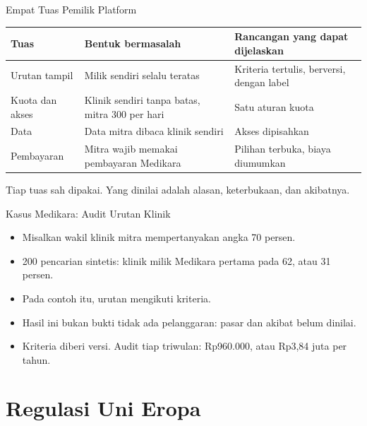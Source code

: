 \documentclass[aspectratio=169, table, 12pt]{beamer}
\begin{document}
\begin{frame}{{\Large Empat Tuas Pemilik Platform}}
  \footnotesize
  \begin{tabularx}{\textwidth}{>{\raggedright\arraybackslash}p{2.4cm} >{\raggedright\arraybackslash}X >{\raggedright\arraybackslash}X}
    \hline
    \textbf{Tuas} & \textbf{Bentuk bermasalah} & \textbf{Rancangan yang dapat dijelaskan} \\ \hline
    Urutan tampil & Milik sendiri selalu teratas & Kriteria tertulis, berversi, dengan label \\ \hline
    Kuota dan akses & Klinik sendiri tanpa batas, mitra 300 per hari & Satu aturan kuota \\ \hline
    Data & Data mitra dibaca klinik sendiri & Akses dipisahkan \\ \hline
    Pembayaran & Mitra wajib memakai pembayaran Medikara & Pilihan terbuka, biaya diumumkan \\ \hline
  \end{tabularx}

  \vspace{8pt}
  \small Tiap tuas sah dipakai. Yang dinilai adalah alasan, keterbukaan, dan akibatnya.
\end{frame}

\begin{frame}{{\Large Kasus Medikara: Audit Urutan Klinik}}
  \vspace{6pt}
  \begin{itemize}
    \item Misalkan wakil klinik mitra mempertanyakan angka 70 persen.
    \item 200 pencarian sintetis: klinik milik Medikara pertama pada 62, atau 31 persen.
    \item Pada contoh itu, urutan mengikuti kriteria.
    \item Hasil ini bukan bukti tidak ada pelanggaran: pasar dan akibat belum dinilai.
    \item Kriteria diberi versi. Audit tiap triwulan: Rp960.000, atau Rp3,84 juta per tahun.
  \end{itemize}
\end{frame}

\section{Regulasi Uni Eropa}
\end{document}
